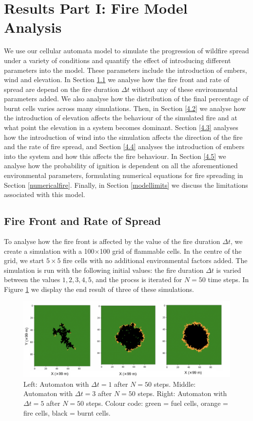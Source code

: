 \newpage
\section{Results Part I: Fire Model Analysis}\label{results_1}

We use our cellular automata model to simulate the progression of wildfire spread under a variety of conditions and quantify the effect of introducing different parameters into the model. These parameters include the introduction of embers, wind and elevation. In Section \ref{4.1} we analyse how the fire front and rate of spread are depend on the fire duration $\Delta t$ without any of these environmental parameters added. We also analyse how the distribution of the final percentage of burnt cells varies across many simulations. Then, in Section \ref{4.2} we analyse how the introduction of elevation affects the behaviour of the simulated fire and at what point the elevation in a system becomes dominant. Section \ref{4.3} analyses how the introduction of wind into the simulation affects the direction of the fire and the rate of fire spread, and Section \ref{4.4} analyses the introduction of embers into the system and how this affects the fire behaviour. In Section \ref{4.5} we analyse how the probability of ignition is dependent on all the aforementioned environmental parameters, formulating numerical equations for fire spreading in Section \ref{numericalfire}. Finally, in Section \ref{modellimits} we discuss the limitations associated with this model.

\subsection{Fire Front and Rate of Spread}\label{4.1}
To analyse how the fire front is affected by the value of the fire duration $\Delta t$, we create a simulation with a 100$\times$100 grid of flammable cells. In the centre of the grid, we start $5\times5$ fire cells with no additional environmental factors added. The simulation is run with the following initial values: the fire duration $\Delta t$ is varied between the values $1,2,3,4,5$, and the procss is iterated for $N=50$ time steps. In Figure \ref{f41} we display the end result of three of these simulations.

\begin{figure}[H]
\centering
\includegraphics[width=\textwidth]{Figures/abba.png}
\caption{Left: Automaton with $\Delta t = 1$ after $N=50$ steps. Middle: Automaton with $\Delta t = 3$ after $N=50$ steps. Right: Automaton with $\Delta t = 5$ after $N=50$ steps. Colour code: \newline green = fuel cells, orange = fire cells, black = burnt cells.}
\label{f41}
\end{figure}
\newpage

